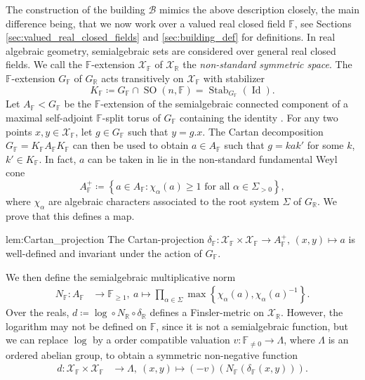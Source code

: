 \documentclass[12pt]{amsart}
\newcommand{\F}{\mathbb{F} }
\newcommand{\R}{\mathbb{R} }
\newcommand{\X}{\mathcal{X}}
\newcommand{\ApF}{A_\F^+}
\newcommand{\B}{\mathcal{B}}
\newcommand{\Id}{\operatorname{Id} }
\numberwithin{equation}{section}
\theoremstyle{remark} %
\begin{document}
The construction of the building $\B$ mimics the above description closely, the main difference being, that we now work over a valued real closed field $\F$, see Sections \ref{sec:valued_real_closed_fields} and \ref{sec:building_def} for definitions. In real algebraic geometry, semialgebraic sets are considered over general real closed fields. We call the $\F$-extension $\X_\F$ of $\X_\R$ the \emph{non-standard symmetric space}. The $\F$-extension $G_\F$ of $G_\R$ acts transitively on $\X_\F$ with stabilizer
$$
K_\F \coloneq G_\F \cap \operatorname{SO}(n,\F) = \operatorname{Stab}_{G_\F}(\Id).
$$ 
Let $A_\F < G_\F$ be the $\F$-extension of the semialgebraic connected component of a maximal self-adjoint $\F$-split torus of $G_\F$ containing the identity \cite[Theorem \ref{I-thm:split_tori}]{AppAGRCF}. For any two points $x,y \in \X_\F$, let $g\in G_\F$ such that $y=g.x$. The Cartan decomposition $G_\F = K_\F A_\F K_\F$ \cite[Theorem \ref{I-thm:KAK}]{AppAGRCF} can then be used to obtain $a \in A_\F$ such that $g=kak'$ for some $k$, $k' \in K_\F$. In fact, $a$ can be taken in lie in the non-standard fundamental Weyl cone
$$
A_\F^+ \coloneq \left\{ a \in A_\F \colon \chi_\alpha(a) \geq 1 \text{ for all } \alpha \in \Sigma_{>0} \right\},
$$
where $\chi_\alpha$ are algebraic characters associated to the root system $\Sigma$ of $G_\R$. We prove that this defines a map.
\begin{replemma}{lem:Cartan_projection}
	The Cartan-projection $\delta_\F \colon \X_\F \times \X_\F  \to \ApF , \,(x,y) \mapsto a$
	is well-defined and invariant under the action of $G_\F$.
\end{replemma} 
We then define the semialgebraic multiplicative norm
\begin{align*}
	N_\F \colon A_\F & \to \F_{\geq 1} , \ 
	a \mapsto \prod_{\alpha \in \Sigma} \max \left\{ \chi_\alpha(a), \chi_\alpha(a)^{-1} \right\}.
\end{align*}
Over the reals, $d \coloneq \log \circ N_\R \circ \delta_\R$ defines a Finsler-metric on $\X_\R$. However, the logarithm may not be defined on $\F$, since it is not a semialgebraic function, but we can replace $\log$ by a order compatible valuation $v \colon \F_{\neq 0} \to \Lambda$, where $\Lambda$ is an ordered abelian group, to obtain a symmetric non-negative function
\begin{align*}
	d \colon \X_\F \times \X_\F &\to \Lambda , \ (x,y) \mapsto (-v)\left( N_\F \left( \delta_\F (x,y)\right) \right).
\end{align*}
\end{document}
